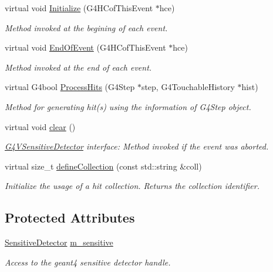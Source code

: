 \begin{DoxyCompactItemize}
virtual void \hyperlink{class_d_d4hep_1_1_simulation_1_1_geant4_sens_det_a64413a736de8cc5d193bf097595ae5d4}{Initialize} (G4\+H\+Cof\+This\+Event $\ast$hce)
\begin{DoxyCompactList}\small\item\em Method invoked at the begining of each event. \end{DoxyCompactList}\item 
virtual void \hyperlink{class_d_d4hep_1_1_simulation_1_1_geant4_sens_det_a37c49991840451bda97aa4640fcd1b4c}{End\+Of\+Event} (G4\+H\+Cof\+This\+Event $\ast$hce)
\begin{DoxyCompactList}\small\item\em Method invoked at the end of each event. \end{DoxyCompactList}\item 
virtual G4bool \hyperlink{class_d_d4hep_1_1_simulation_1_1_geant4_sens_det_aafdd578f5e7d1ac5885a715b9a101567}{Process\+Hits} (G4\+Step $\ast$step, G4\+Touchable\+History $\ast$hist)
\begin{DoxyCompactList}\small\item\em Method for generating hit(s) using the information of G4\+Step object. \end{DoxyCompactList}\item 
virtual void \hyperlink{class_d_d4hep_1_1_simulation_1_1_geant4_sens_det_a6840565286dac4c3b705d86589010e37}{clear} ()
\begin{DoxyCompactList}\small\item\em \hyperlink{class_g4_v_sensitive_detector}{G4\+V\+Sensitive\+Detector} interface\+: Method invoked if the event was aborted. \end{DoxyCompactList}\item 
virtual size\+\_\+t \hyperlink{class_d_d4hep_1_1_simulation_1_1_geant4_sens_det_af75a2eab653115fffe05ccb32828a461}{define\+Collection} (const std\+::string \&coll)
\begin{DoxyCompactList}\small\item\em Initialize the usage of a hit collection. Returns the collection identifier. \end{DoxyCompactList}\end{DoxyCompactItemize}
\subsection*{Protected Attributes}
\begin{DoxyCompactItemize}
\item 
\hyperlink{class_d_d4hep_1_1_simulation_1_1_geant4_action_s_d_a8a292947ea3f9b419728ef729a7e3fae}{Sensitive\+Detector} \hyperlink{class_d_d4hep_1_1_simulation_1_1_geant4_sens_det_a0790d04fc8724269797452cb89b91d39}{m\+\_\+sensitive}
\begin{DoxyCompactList}\small\item\em Access to the geant4 sensitive detector handle. \end{DoxyCompactList}\end{DoxyCompactItemize}
